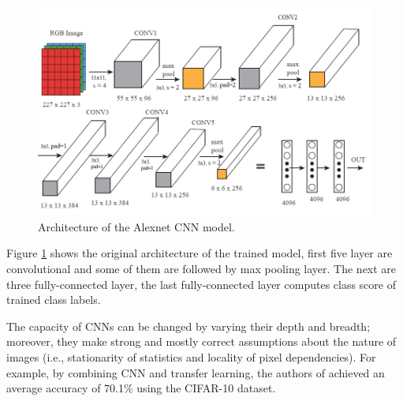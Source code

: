 \begin{figure}
\centering
 \includegraphics[width=0.8\linewidth]{Figures/AlexNet.png}
 \caption{Architecture of the Alexnet CNN model.}
 \label{fig:alex}
\end{figure}
Figure \ref{fig:alex} shows the original architecture of the trained model, first five layer are convolutional and some of them are followed by max pooling layer. The next are three fully-connected layer, the last fully-connected layer computes class score of trained class labels.

The capacity of CNNs can be changed by varying their depth and breadth; moreover, they make strong and mostly correct assumptions about the nature of images (i.e., stationarity of statistics and locality of pixel dependencies). For example, by combining CNN and transfer learning, the authors of \cite{hussain2018study} achieved an average accuracy of 70.1\% using the CIFAR-10  \cite{krizhevsky2009learning} dataset.

